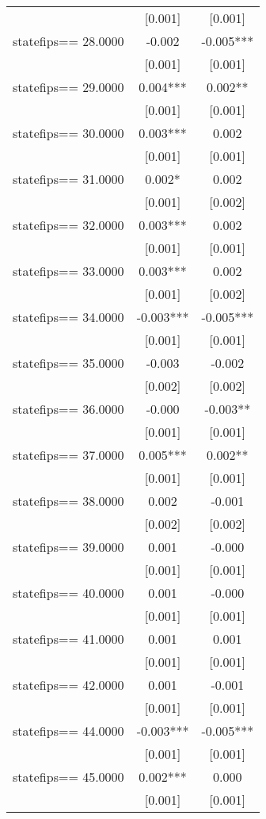 \documentclass[]{article}
\begin{document}
\begin{tabular}{lcc}
 & [0.001] & [0.001] \\
statefips==    28.0000 & -0.002 & -0.005*** \\
 & [0.001] & [0.001] \\
statefips==    29.0000 & 0.004*** & 0.002** \\
 & [0.001] & [0.001] \\
statefips==    30.0000 & 0.003*** & 0.002 \\
 & [0.001] & [0.001] \\
statefips==    31.0000 & 0.002* & 0.002 \\
 & [0.001] & [0.002] \\
statefips==    32.0000 & 0.003*** & 0.002 \\
 & [0.001] & [0.001] \\
statefips==    33.0000 & 0.003*** & 0.002 \\
 & [0.001] & [0.002] \\
statefips==    34.0000 & -0.003*** & -0.005*** \\
 & [0.001] & [0.001] \\
statefips==    35.0000 & -0.003 & -0.002 \\
 & [0.002] & [0.002] \\
statefips==    36.0000 & -0.000 & -0.003** \\
 & [0.001] & [0.001] \\
statefips==    37.0000 & 0.005*** & 0.002** \\
 & [0.001] & [0.001] \\
statefips==    38.0000 & 0.002 & -0.001 \\
 & [0.002] & [0.002] \\
statefips==    39.0000 & 0.001 & -0.000 \\
 & [0.001] & [0.001] \\
statefips==    40.0000 & 0.001 & -0.000 \\
 & [0.001] & [0.001] \\
statefips==    41.0000 & 0.001 & 0.001 \\
 & [0.001] & [0.001] \\
statefips==    42.0000 & 0.001 & -0.001 \\
 & [0.001] & [0.001] \\
statefips==    44.0000 & -0.003*** & -0.005*** \\
 & [0.001] & [0.001] \\
statefips==    45.0000 & 0.002*** & 0.000 \\
 & [0.001] & [0.001] \\

\end{tabular}
\end{document}
